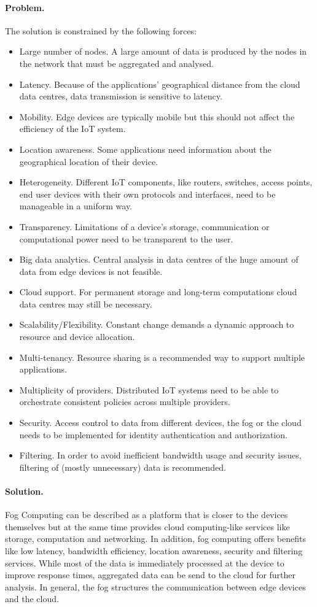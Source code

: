 \paragraph{\textbf{Problem.}} The solution is constrained by the following forces:
\begin{itemize}
	\item Large number of nodes. A large amount of data is produced by the nodes in the network that must be aggregated and analysed.
	\item Latency. Because of the applications' geographical distance from the cloud data centres, data transmission is sensitive to latency. 
	\item Mobility. Edge devices are typically mobile but this should not affect the efficiency of the IoT system.
	\item Location awareness. Some applications need information about the geographical location of their device. 
	\item Heterogeneity. Different IoT components,  like routers, switches, access points, end user devices with their own protocols and interfaces, need to be manageable in a uniform way.
	\item Transparency. Limitations of a device's storage, communication or computational power need to be transparent to the user.
	\item Big data analytics. Central analysis in data centres of the huge amount of data from edge devices is not feasible.
	\item Cloud support. For permanent storage and long-term computations cloud data centres may still be necessary.
	\item Scalability/Flexibility. Constant change demands a dynamic approach to resource and device allocation.
	\item Multi-tenancy. Resource sharing is a recommended way to support multiple applications.
	\item Multiplicity of providers. Distributed IoT systems need to be able to orchestrate consistent policies across multiple providers.
	\item Security. Access control to data from different devices, the fog or the cloud needs to be implemented for identity authentication and authorization.
	\item Filtering. In order to avoid inefficient bandwidth usage and security issues, filtering of (mostly unnecessary) data is recommended.
\end{itemize}

\paragraph{\textbf{Solution.}} Fog Computing can be described as a platform that is closer to the devices themselves but at the same time provides cloud computing-like services like storage, computation and networking. In addition, fog computing offers benefits like low latency, bandwidth efficiency, location awareness, security and filtering services. While most of the data is immediately processed at the device to improve response times, aggregated data can be send to the cloud for further analysis. In general, the fog structures the communication between edge devices and the cloud.


